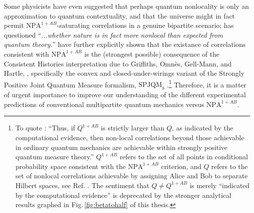 \documentclass[
  12pt          %
  ,letterpaper  %
  ,center       %
  ,noupper      %
  ,english,fleqn]{uconnthesis}
\newcommand{\fig}[1]{Fig.\,\ref{#1}}
\begin{document}
Some physicists have even suggested that perhaps quantum nonlocality is only an approximation to quantum contextuality, and that the universe might in fact permit $\mbox{NPA}^{1+AB}$-saturating correlations in a genuine bipartite scenario; \citet{PopescuReviewNatureComm} has questioned ``\textit{...whether nature is in fact more nonlocal than expected from quantum theory.}'' \citet{ConsistentHistoriesContextuality} have further explicitly shown that the existance of correlations consistent with $\mbox{NPA}^{1+AB}$ is the (strongest possible) consequence of the Consistent Histories interpretation due to Griffiths, Omnès, Gell-Mann, and Hartle, \citep[and references therein]{HistoriesShort,HistoriesReviewDowker,HistoriesReview}, specifically the convex and closed-under-wirings variant of the Strongly Positive Joint Quantum Measure formalism, $\mbox{SPJQM}_b$ \citep[Sec. 5-6]{ConsistentHistoriesContextuality}.\footnote{To quote \citet{ConsistentHistoriesContextuality}: ``Thus, if $Q^{1+AB}$ is strictly larger than $Q$, as indicated by the computational evidence, then non-local correlations beyond those achievable in ordinary quantum mechanics are achievable within strongly positive quantum measure theory.'' $Q^{1+AB}$ refers to the set of all points in conditional probability space consistent with the $\mbox{NPA}^{1+AB}$ criterion, and $Q$ refers to the set of nonlocal correlations achievable by assigning Alice and Bob to separate Hilbert spaces, see Ref. \cite{AlmostQuantum2}. The sentiment that $Q \neq Q^{1+AB}$ is merely ``indicated by the computational evidence'' is deprecated by the stronger analytical results graphed in \fig{fig:betatohalf} of this thesis.} Therefore, it is a matter of urgent importance to improve our understanding of the different experimental predictions of conventional multipartite quantum mechanics versus $\mbox{NPA}^{1+AB}$.


\end{document}
